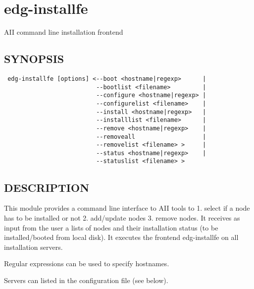 \section{edg-installfe\label{edg-installfe}}


AII command line installation frontend

\subsection*{SYNOPSIS\label{edg-installfe_SYNOPSIS}}
\begin{verbatim}
 edg-installfe [options] <--boot <hostname|regexp>      |
                          --bootlist <filename>         |
                          --configure <hostname|regexp> |
                          --configurelist <filename>    |
                          --install <hostname|regexp>   |
                          --installlist <filename>      |
                          --remove <hostname|regexp>    |
                          --removeall                   |
                          --removelist <filename> >     |
                          --status <hostname|regexp>    |
                          --statuslist <filename> >
\end{verbatim}
\subsection*{DESCRIPTION\label{edg-installfe_DESCRIPTION}}


This module provides a command line interface to AII tools to 1.
select if a node has to be installed or not 2. add/update nodes
3. remove nodes.  It receives as input from the user
a lists of nodes and their installation status (to be installed/booted from local disk).
It executes the frontend edg-installfe on all installation servers.



Regular expressions can be used to specify hostnames.



Servers can listed in the configuration file (see below).

